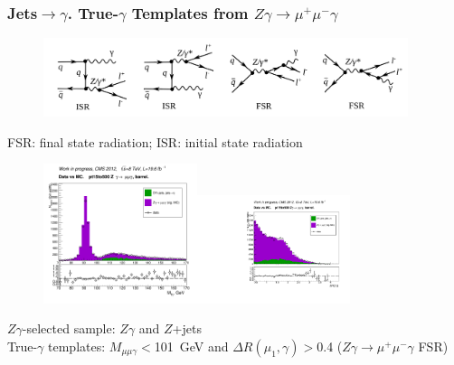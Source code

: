 \begin{frame}\frametitle{Jets$\rightarrow \gamma$. True-$\gamma$ Templates from $Z\gamma\rightarrow \mu^+ \mu^- \gamma $}

  \begin{figure}[htb]
      \begin{center}
        \scriptsize
          \includegraphics[width=0.95\textwidth]{../figs/ForPresentation/feynmZg_LO.png}
       \end{center}
    \end{figure}

\scriptsize
FSR: final state radiation; ISR: initial state radiation

  \begin{figure}[htb]
    \begin{center}
       \includegraphics[width=0.40\textwidth]{../figs/figs_v11/MUON_ZGamma/PrepareYields/c_TotalDATAvsMC_Barrel__MpholeplepVERY_PRELIMINARY_pt15to500_.png}\includegraphics[width=0.40\textwidth]{../figs/figs_v11/MUON_ZGamma/PrepareYields/c_TotalDATAvsMC_Barrel__lep1PhoDeltaRVERY_PRELIMINARY_pt15to500_.pdf}\\
    \end{center}
  \end{figure}
\scriptsize
$Z\gamma$-selected sample: $Z\gamma$ and $Z$+jets\\
True-$\gamma$ templates: $M_{\mu\mu\gamma}<$101~GeV and $\Delta R(\mu_{1},\gamma)>$0.4 ($Z\gamma\rightarrow\mu^+ \mu^- \gamma $ FSR)\\

\end{frame}%

